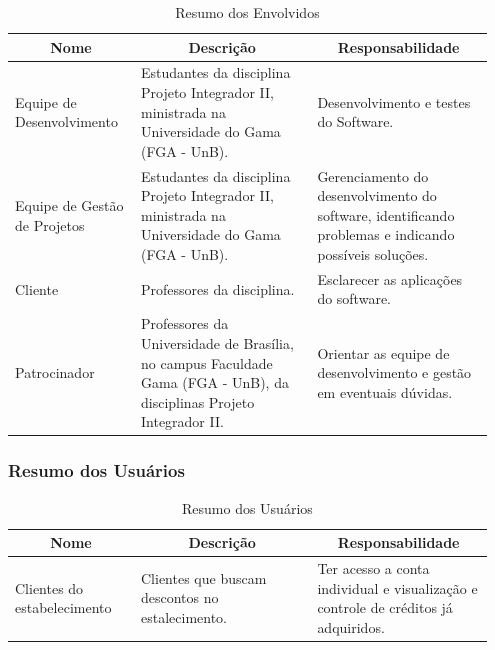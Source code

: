 \begin{table}[htp]
    \centering
    \caption{Resumo dos Envolvidos}
    \label{my-label}
    \begin{tabular}{|p{0.25\linewidth}|p{0.35\linewidth}|p{0.35\linewidth}|}
        \hline
        \multicolumn{1}{|c|}{\textbf{Nome}} & \multicolumn{1}{c|}{\textbf{Descrição}} & \multicolumn{1}{c|}{\textbf{Responsabilidade}} \\ \hline
        Equipe de  Desenvolvimento          &        Estudantes da disciplina Projeto Integrador II, ministrada na Universidade do Gama (FGA - UnB).                                 &               Desenvolvimento e testes do Software.                                 \\ \hline
        Equipe de Gestão de Projetos                                    &     Estudantes da disciplina Projeto Integrador II, ministrada na Universidade do Gama (FGA - UnB).                                    &           Gerenciamento do desenvolvimento do software, identificando problemas e indicando possíveis soluções.                                     \\ \hline
        Cliente                                   &             Professores da disciplina.                            &         Esclarecer as aplicações do software.                                       \\ \hline
        Patrocinador                                    &         Professores da Universidade de Brasília, no campus Faculdade Gama (FGA - UnB), da disciplinas Projeto Integrador II.                                &       Orientar as equipe de desenvolvimento e gestão em eventuais dúvidas.                                         \\ \hline
    \end{tabular}
\end{table}

\subsubsection{Resumo dos Usuários}

\begin{table}[htp]
    \centering
    \caption{Resumo dos Usuários}
    \label{my-label}
    \begin{tabular}{|p{0.25\linewidth}|p{0.35\linewidth}|p{0.35\linewidth}|}
        \hline
        \multicolumn{1}{|c|}{\textbf{Nome}} & \multicolumn{1}{c|}{\textbf{Descrição}} & \multicolumn{1}{c|}{\textbf{Responsabilidade}} \\ \hline
        Clientes do estabelecimento & Clientes que buscam descontos no estalecimento. & Ter acesso a conta individual e visualização e controle de créditos já adquiridos. \\ \hline
    \end{tabular}
\end{table}

